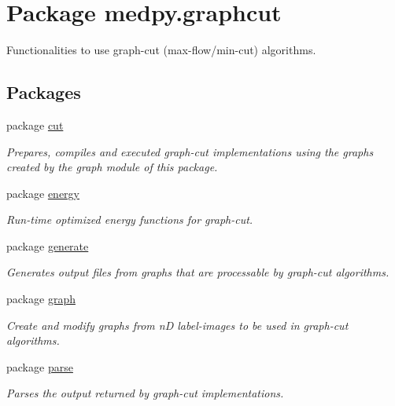 \hypertarget{namespacemedpy_1_1graphcut}{
\section{Package medpy.graphcut}
\label{namespacemedpy_1_1graphcut}
}


Functionalities to use graph-\/cut (max-\/flow/min-\/cut) algorithms.  


\subsection*{Packages}
\begin{DoxyCompactItemize}
\item 
package \hyperlink{namespacemedpy_1_1graphcut_1_1cut}{cut}


\begin{DoxyCompactList}\small\item\em Prepares, compiles and executed graph-\/cut implementations using the graphs created by the graph module of this package. \end{DoxyCompactList}

\item 
package \hyperlink{namespacemedpy_1_1graphcut_1_1energy}{energy}


\begin{DoxyCompactList}\small\item\em Run-\/time optimized energy functions for graph-\/cut. \end{DoxyCompactList}

\item 
package \hyperlink{namespacemedpy_1_1graphcut_1_1generate}{generate}


\begin{DoxyCompactList}\small\item\em Generates output files from graphs that are processable by graph-\/cut algorithms. \end{DoxyCompactList}

\item 
package \hyperlink{namespacemedpy_1_1graphcut_1_1graph}{graph}


\begin{DoxyCompactList}\small\item\em Create and modify graphs from nD label-\/images to be used in graph-\/cut algorithms. \end{DoxyCompactList}

\item 
package \hyperlink{namespacemedpy_1_1graphcut_1_1parse}{parse}


\begin{DoxyCompactList}\small\item\em Parses the output returned by graph-\/cut implementations. \end{DoxyCompactList}

\end{DoxyCompactItemize}
